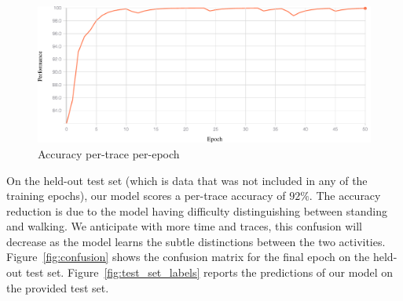 \documentclass{article}
\begin{document}
\begin{figure}[h]
    \centering
    \includegraphics[width=\linewidth]{figures/performance_plot.pdf}
    \caption{Accuracy per-trace per-epoch \label{fig:acc_ptpe}}
\end{figure}

On the held-out test set (which is data that was not included in any of the training epochs),
our model scores a per-trace accuracy of $92\%$. The accuracy reduction is due to the
model having difficulty distinguishing between standing and walking. We anticipate with
more time and traces, this confusion will decrease as the model learns the subtle distinctions
between the two activities. Figure~\ref{fig:confusion} shows the confusion matrix for the
final epoch on the held-out test set. Figure~\ref{fig:test_set_labels} reports the predictions
of our model on the provided test set.
\end{document}
